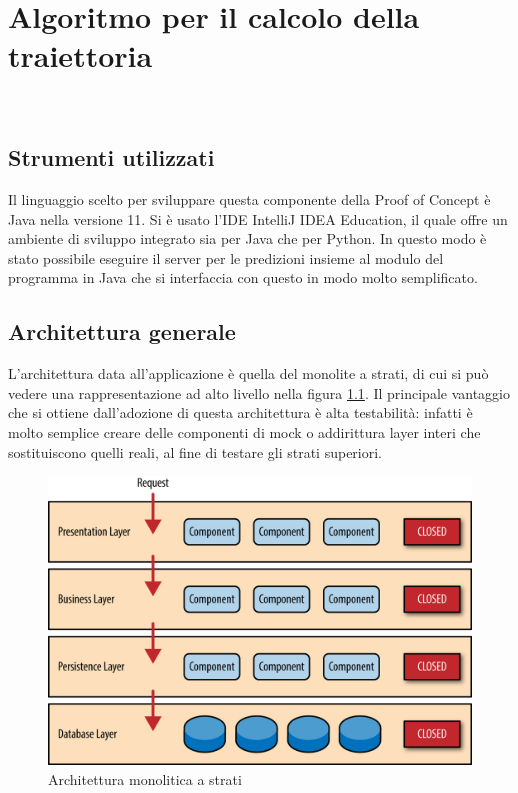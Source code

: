 
\chapter{Algoritmo per il calcolo della traiettoria}
\label{cap:business-logic}

\\


\section{Strumenti utilizzati}
Il linguaggio scelto per sviluppare questa componente della Proof of Concept è Java nella versione 11. Si è usato l'IDE IntelliJ IDEA Education, il quale offre un ambiente di sviluppo integrato sia per Java che per Python. In questo modo è stato possibile eseguire il server per le predizioni insieme al modulo del programma in Java che si interfaccia con questo in modo molto semplificato.

\section{Architettura generale}
L'architettura data all'applicazione è quella del monolite a strati, di cui si può vedere una rappresentazione ad alto livello nella figura \ref{fig:layered_architecture}. Il principale vantaggio che si ottiene dall'adozione di questa architettura è alta testabilità: infatti è molto semplice creare delle componenti di mock o addirittura layer interi che sostituiscono quelli reali, al fine di testare gli strati superiori.
    
\begin{figure}
    \centering
    \includegraphics[width=\textwidth]{immagini/layered_archiecture.png}
    \caption{Architettura monolitica a strati}
    \label{fig:layered_architecture}
\end{figure}

